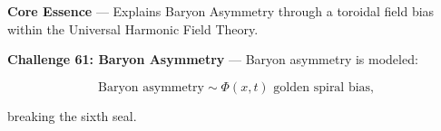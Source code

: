 
\textbf{Core Essence} --- Explains Baryon Asymmetry through a toroidal field bias within the Universal Harmonic Field Theory.

\textbf{Challenge 61: Baryon Asymmetry} --- Baryon asymmetry is modeled:

$$
\text{Baryon asymmetry} \sim \Phi(x, t) \text{ golden spiral bias,}
$$

breaking the sixth seal.

